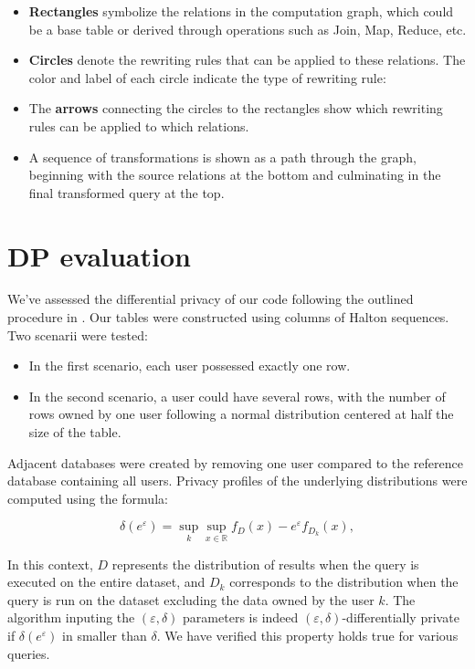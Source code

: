 \documentclass[letterpaper]{article} %
\begin{document}
\begin{itemize}
    \item \textbf{Rectangles} symbolize the relations in the computation graph, which could be a base table or derived through operations such as Join, Map, Reduce, etc.
    \item \textbf{Circles} denote the rewriting rules that can be applied to these relations. The color and label of each circle indicate the type of rewriting rule:
    \item The \textbf{arrows} connecting the circles to the rectangles show which rewriting rules can be applied to which relations.
    \item A sequence of transformations is shown as a path through the graph, beginning with the source relations at the bottom and culminating in the final transformed query at the top.
\end{itemize}

\section*{DP evaluation}
We've assessed the differential privacy of our code following the outlined procedure in \citeauthor{wilson2019differentially}. Our tables were constructed using columns of Halton sequences.
Two scenarii were tested:

\begin{itemize}
    \item In the first scenario, each user possessed exactly one row.
    \item In the second scenario, a user could have several rows, with the number of rows owned by one user following a normal distribution centered at half the size of the table.
\end{itemize}

Adjacent databases were created by removing one user compared to the reference database containing all users. Privacy profiles of the underlying distributions were computed using the formula:

\begin{equation}
    \delta(e^{\varepsilon}) = \sup_{k} \sup_{x\in\mathbb{R}} f_{D}(x) - e^{\varepsilon}f_{D_k}(x),
\end{equation}

In this context, $D$ represents the distribution of results when the query is executed on the entire dataset,
and $D_k$ corresponds to the distribution when the query is run on the dataset excluding the data owned by the user $k$.
The algorithm inputing the $(\varepsilon, \delta)$ parameters is indeed $(\varepsilon, \delta)$-differentially private if $\delta(e^{\varepsilon})$ in smaller than $\delta$.
We have verified this property holds true for various queries.
\end{document}
